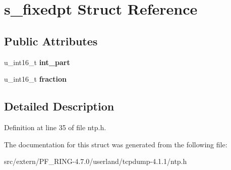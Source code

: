 \hypertarget{structs__fixedpt}{
\section{s\_\-fixedpt Struct Reference}
\label{structs__fixedpt}
}
\subsection*{Public Attributes}
\begin{DoxyCompactItemize}
\item 
\hypertarget{structs__fixedpt_a2f21108e23b7ca1c39247b7eadc5f352}{
u\_\-int16\_\-t {\bfseries int\_\-part}}
\label{structs__fixedpt_a2f21108e23b7ca1c39247b7eadc5f352}

\item 
\hypertarget{structs__fixedpt_a1bd1dba7af3bf59eabddf961b48bf625}{
u\_\-int16\_\-t {\bfseries fraction}}
\label{structs__fixedpt_a1bd1dba7af3bf59eabddf961b48bf625}

\end{DoxyCompactItemize}


\subsection{Detailed Description}


Definition at line 35 of file ntp.h.



The documentation for this struct was generated from the following file:\begin{DoxyCompactItemize}
\item 
src/extern/PF\_\-RING-\/4.7.0/userland/tcpdump-\/4.1.1/ntp.h\end{DoxyCompactItemize}
